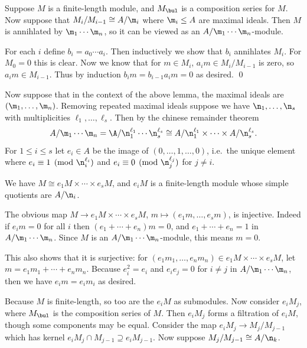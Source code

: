 \blemm

    Suppose $M$ is a finite-length module, and $M_\bul$ is a composition series for $M$.
    Now suppose that $M_i/M_{i-1}\cong A/\m_i$ where $\m_i\leq A$ are maximal ideals.
    Then $M$ is annihlated by $\m_1\cdots\m_n$, so it can be viewed as an $A/\m_1\cdots\m_n$-module.

\elemm

\bproof

    For each $i$ define $b_i=a_0\cdots a_i$.
    Then inductively we show that $b_i$ annihlates $M_i$.
    For $M_0=0$ this is clear.
    Now we know that for $m\in M_i$, $a_im\in M_i/M_{i-1}$ is zero, so $a_im\in M_{i-1}$.
    Thus by induction $b_im=b_{i-1}a_im=0$ as desired.
    \qed

\eproof

Now suppose that in the context of the above lemma, the maximal ideals are $(\m_1,\dots,\m_n)$.
Removing repeated maximal ideals suppose we have $\n_1,\dots,\n_s$ with multiplicities $\ell_1,\dots,\ell_s$.
Then by the chinese remainder theorem
$$ A/\m_1\cdots\m_n = \A/\n_1^{\ell_1}\cdots\n_s^{\ell_s} \cong A/\n_1^{\ell_1}\times\cdots\times A/\n_s^{\ell_s} . $$
For $1\leq i\leq s$ let $e_i\in A$ be the image of $(0,\dots,1,\dots,0)$, i.e.\ the unique element where $e_i\equiv1\pmod{\n_i^{\ell_i}}$ and $e_i\equiv0\pmod{\n_j^{\ell_j}}$ for $j\neq i$.

\blemm

    We have $M\cong e_1M\times\cdots\times e_sM$, and $e_iM$ is a finite-length module whose simple quotients are $A/\n_i$.

\elemm

\bproof

    The obvious map $M\to e_1M\times\cdots\times e_sM$, $m\mapsto(e_1m,\dots,e_sm)$, is injective.
    Indeed if $e_im=0$ for all $i$ then $(e_1+\cdots+e_n)m=0$, and $e_1+\cdots+e_n=1$ in $A/\m_1\cdots\m_n$.
    Since $M$ is an $A/\m_1\cdots\m_n$-module, this means $m=0$.

    This also shows that it is surjective: for $(e_1m_1,\dots,e_nm_n)\in e_1M\times\cdots\times e_sM$, let $m=e_1m_1+\cdots+e_nm_n$.
    Because $e_i^2=e_i$ and $e_ie_j=0$ for $i\neq j$ in $A/\m_1\cdots\m_n$, then we have $e_im=e_im_i$ as desired.

    Because $M$ is finite-length, so too are the $e_iM$ as submodules.
    Now consider $e_iM_j$, where $M_\bul$ is the composition series of $M$.
    Then $e_iM_j$ forms a filtration of $e_iM$, though some components may be equal.
    Consider the map $e_iM_j\to M_j/M_{j-1}$ which has kernel $e_iM_j\cap M_{j-1}\supseteq e_iM_{j-1}$.
    Now suppose $M_j/M_{j-1}\cong A/\n_k$.

